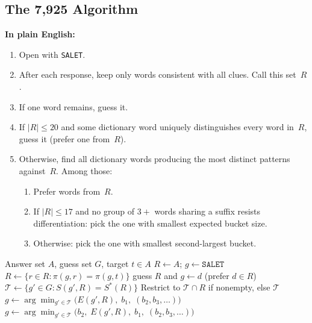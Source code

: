 \documentclass[11pt]{article}
\begin{document}
	\subsection{The 7,925 Algorithm}
	\label{sec:algorithm}
	
	\textbf{In plain English:}
	\begin{enumerate}[nosep]
		\item Open with \texttt{SALET}.
		\item After each response, keep only words consistent with all clues.  Call this set~$R$.
		\item If one word remains, guess it.
		\item If $|R| \leq 20$ and some dictionary word uniquely distinguishes every word in~$R$, guess it (prefer one from~$R$).
		\item Otherwise, find all dictionary words producing the most distinct patterns against~$R$.  Among those:
		\begin{enumerate}[nosep]
			\item Prefer words from~$R$.
			\item If $|R| \leq 17$ and no group of $3{+}$ words sharing a suffix resists differentiation: pick the one with smallest expected bucket size.
			\item Otherwise: pick the one with smallest second-largest bucket.
		\end{enumerate}
	\end{enumerate}
	
	\begin{algorithm}[h]
		\caption{The 7,925 Solver}
		\label{alg:7925}
		\begin{algorithmic}[1]
			\Require Answer set $A$, guess set $G$, target $t \in A$
			\State $R \gets A$;\; $g \gets \texttt{SALET}$
			\Loop
			\State $R \gets \{r \in R : \pi(g,r) = \pi(g,t)\}$
			 guess $R$ and \Return \EndIf
			\State $g \gets d$ (prefer $d \in R$)
			\Else
			\State $\mathcal{T} \gets \{g' \in G : S(g',R) = S^*(R)\}$
			\State Restrict to $\mathcal{T} \cap R$ if nonempty, else $\mathcal{T}$
			\State $g \gets \arg\min_{g' \in \mathcal{T}}\bigl(E(g',R),\; b_1,\; (b_2, b_3, \ldots)\bigr)$
			\Else
			\State $g \gets \arg\min_{g' \in \mathcal{T}}\bigl(b_2,\; E(g',R),\; b_1,\; (b_2, b_3, \ldots)\bigr)$
			\EndIf
			\EndIf
			\EndLoop
		\end{algorithmic}
	\end{algorithm}
	
\end{document}
